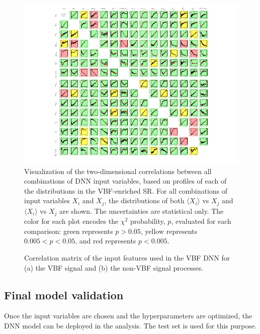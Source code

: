 \begin{figure}[t]
    \includegraphics[width=\textwidth,trim=45 0 45 0]{figures/hww/dnn/correlations_PROF_SR.pdf}
    \caption{Visualization of the two-dimensional correlations between all combinations of DNN input variables, based on profiles of each of the distributions in the VBF-enriched \TwoJet SR. For all combinations of input variables $X_i$ and $X_j$, the distributions of both $\langle X_i \rangle$ vs $X_j$ and $\langle X_i \rangle$ vs $X_j$ are shown. The uncertainties are statistical only. The color for each plot encodes the $\chi^2$ probability, $p$, evaluated for each comparison: green represents $p > 0.05$, yellow represents $0.005 < p < 0.05$, and red represents $p < 0.005$.}
    \label{fig:dnn-features-profiles}
\end{figure}




\begin{figure}[t]
    \caption{Correlation matrix of the input features used in the VBF DNN for (a) the VBF signal and (b) the non-VBF signal processes.}
    \label{fig:dnn-features-correlations}
\end{figure}



\subsection{Final model validation}
\label{subsec:fina-model-validation}
Once the input variables are chosen and the hyperparameters are optimized, the DNN model can be deployed in the analysis. The test set is used for this purpose. 

